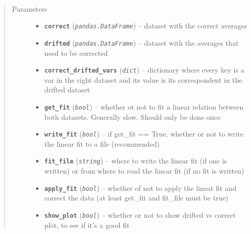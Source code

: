 \documentclass[a4paper,10pt,oneside]{sphinxmanual}
\begin{document}
\begin{fulllineitems}
\label{pymicra:pymicra.util.correctDrift}~\begin{quote}\begin{description}
\item[{Parameters}] \leavevmode\begin{itemize}
\item {} 
\textbf{\texttt{correct}} (\emph{\texttt{pandas.DataFrame}}) -- dataset with the correct averages

\item {} 
\textbf{\texttt{drifted}} (\emph{\texttt{pandas.DataFrame}}) -- dataset with the averages that need to be corrected

\item {} 
\textbf{\texttt{correct\_drifted\_vars}} (\emph{\texttt{dict}}) -- dictionary where every key is a var in the right dataset and
its value is its correspondent in the drifted dataset

\item {} 
\textbf{\texttt{get\_fit}} (\emph{\texttt{bool}}) -- whether ot not to fit a linear relation between both datasets. Generally slow. Should only be done once

\item {} 
\textbf{\texttt{write\_fit}} (\emph{\texttt{bool}}) -- if get\_fit == True, whether or not to write the linear fit to a file (recommended)

\item {} 
\textbf{\texttt{fit\_file}} (\emph{\texttt{string}}) -- where to write the linear fit (if one is written) or from where to read the linear fit (if no fit is written)

\item {} 
\textbf{\texttt{apply\_fit}} (\emph{\texttt{bool}}) -- whether of not to apply the lineat fit and correct the data (at least get\_fit and fit\_file must be true)

\item {} 
\textbf{\texttt{show\_plot}} (\emph{\texttt{bool}}) -- whether or not to show drifted vs correct plot, to see if it's a good fit


\end{itemize}
\end{description}
\end{quote}
\end{fulllineitems}
\end{document}
